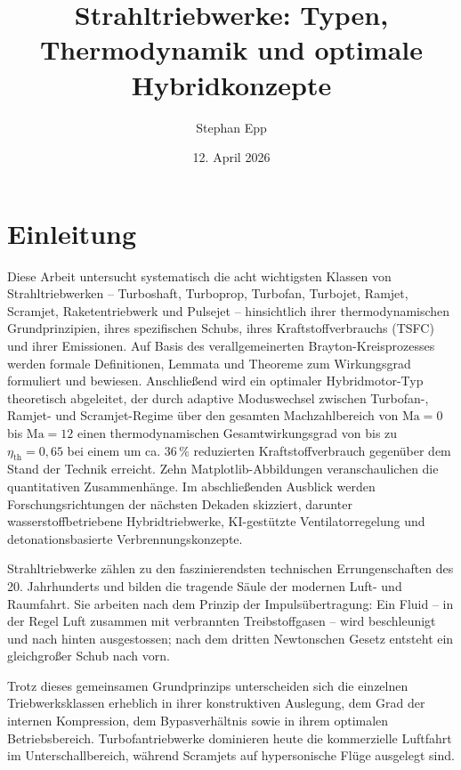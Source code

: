﻿\documentclass[12pt,a4paper]{article}
\title{\textbf{Strahltriebwerke: Typen, Thermodynamik und optimale Hybridkonzepte}}
\author{Stephan Epp}
\date{12. April 2026}
\theoremstyle{remark}
\newcommand{\Ma}{\mathrm{Ma}}
\newcommand{\etath}{\eta_{\mathrm{th}}}
\begin{document}
\maketitle
\tableofcontents
\newpage

\section{Einleitung}
    Diese Arbeit untersucht systematisch die acht wichtigsten Klassen von Strahltriebwerken --
Turboshaft, Turboprop, Turbofan, Turbojet, Ramjet, Scramjet, Raketentriebwerk und Pulsejet --
hinsichtlich ihrer thermodynamischen Grundprinzipien, ihres spezifischen Schubs,
ihres Kraftstoffverbrauchs (TSFC) und ihrer Emissionen.
Auf Basis des verallgemeinerten Brayton-Kreisprozesses werden formale Definitionen,
Lemmata und Theoreme zum Wirkungsgrad formuliert und bewiesen.
Anschlie{\ss}end wird ein optimaler Hybridmotor-Typ theoretisch abgeleitet,
der durch adaptive Moduswechsel zwischen Turbofan-, Ramjet- und Scramjet-Regime
\"uber den gesamten Machzahlbereich von $\Ma = 0$ bis $\Ma = 12$
einen thermodynamischen Gesamtwirkungsgrad von bis zu $\etath = 0{,}65$
bei einem um ca. $36\,\%$ reduzierten Kraftstoffverbrauch gegen\"uber dem
Stand der Technik erreicht.
Zehn Matplotlib-Abbildungen veranschaulichen die quantitativen Zusammenh\"ange.
Im abschlie{\ss}enden Ausblick werden Forschungsrichtungen der n\"achsten Dekaden skizziert,
darunter wasserstoffbetriebene Hybridtriebwerke,
KI-gest\"utzte Ventilatorregelung und detonationsbasierte Verbrennungskonzepte.

Strahltriebwerke z\"ahlen zu den faszinierendsten technischen Errungenschaften des 20. Jahr\-hun\-derts
und bilden die tragende S\"aule der modernen Luft- und Raumfahrt.
Sie arbeiten nach dem Prinzip der Impuls\"ubertragung: Ein Fluid -- in der Regel Luft
zusammen mit verbrannten Treibstoffgasen -- wird beschleunigt und nach hinten
ausgestossen; nach dem dritten Newtonschen Gesetz entsteht ein gleichgro{\ss}er
Schub nach vorn.

Trotz dieses gemeinsamen Grundprinzips unterscheiden sich die einzelnen Triebwerksklassen
erheblich in ihrer konstruktiven Auslegung, dem Grad der internen Kompression,
dem Bypasverh\"altnis sowie in ihrem optimalen Betriebsbereich.
Turbofantriebwerke dominieren heute die kommerzielle Luftfahrt im Unterschallbereich,
w\"ahrend Scramjets auf hypersonische Fl\"uge ausgelegt sind.
\end{document}
